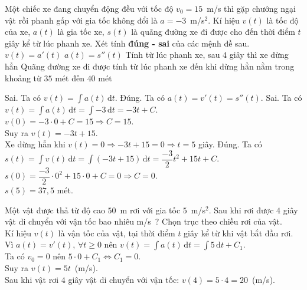 \begin{ex}%
Một chiếc xe đang chuyển động đều với tốc độ $v_0=15$~m/s thì gặp chướng ngại vật rồi phanh gấp với gia tốc không đổi là $a=-3$~m/s$^2$. Kí hiệu $v(t)$ là tốc độ của xe, $a(t)$ là gia tốc xe, $s(t)$ là quãng đường xe đi được cho đến thời điểm $t$ giây kể từ lúc phanh xe. Xét tính \textbf{đúng - sai} của các mệnh đề sau.
\choiceTF
{$v(t)=a'(t)$}
{\True $a(t)=s''(t)$}
{Tính từ lúc phanh xe, sau $4$ giây thì xe dừng hẳn}
{\True Quãng đường xe đi được tính từ lúc phanh xe đến khi dừng hẳn nằm trong khoảng từ $35$ mét đến $40$ mét}
\loigiai
{
	\begin{itemchoice}
	\itemch Sai. Ta có $v(t)=\displaystyle\int a(t)\mathrm{\,d}t$.
	\itemch Đúng. Ta có $a(t)=v'(t)=s''(t)$.
	\itemch Sai. Ta có $v(t)=\displaystyle\int a(t)\mathrm{\,d}t=\displaystyle\int -3\mathrm{\,d}t=-3t+C$.\\
	$v(0)=-3\cdot 0+C=15\Rightarrow C=15$.\\
	Suy ra $ v(t)=-3t+15$.\\
	Xe dừng hẳn khi $v(t)=0\Rightarrow -3t+15=0\Rightarrow t=5$ giây.
	\itemch Đúng. Ta có $s(t)=\displaystyle\int v(t)\mathrm{\,d}t=\displaystyle\int (-3t+15)\mathrm{\,d}t=\dfrac{-3}{2}t^2+15t+C$.\\
	$s(0)=\dfrac{-3}{2}\cdot 0^2+15\cdot 0+C=0\Rightarrow C=0$.\\
	$s(5)=37{,}5$ mét.
	\end{itemchoice}
}
\end{ex}

\begin{ex}%
Một vật được thả từ độ cao $50$~m rơi với gia tốc $5$~m/s$^2$. Sau khi rơi được $4$ giây vật di chuyển với vận tốc bao nhiêu m/s~?
\loigiai
{
	Chọn trục theo chiều rơi của vật.\\
	Kí hiệu $v(t)$ là vận tốc của vật, tại thời điểm $t$ giây kể từ khi vật bắt đầu rơi.\\
	Vì $a(t)=v'(t)$, $\forall t\ge 0$ nên $v(t)=\displaystyle\int a(t)\mathrm{\,d}t=\displaystyle\int 5\mathrm{\,d}t+C_1$.\\
	Ta có $v_0=0$ nên $5\cdot0+C_1 \Leftrightarrow C_1=0$.\\
	Suy ra $v(t)=5t$~(m/s).\\
	Sau khi vật rơi $4$	giây vật di chuyển với vận tốc: $v(4)=5\cdot4=20$~(m/s).
}
\end{ex}

